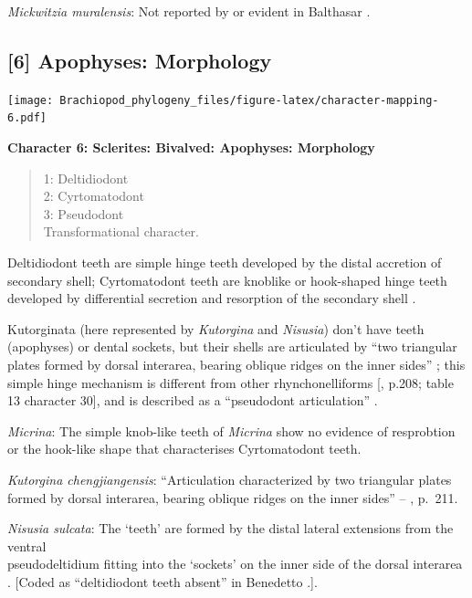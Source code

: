 \documentclass[]{book}
\theoremstyle{definition}
\theoremstyle{definition}
\theoremstyle{definition}
\theoremstyle{remark}
\begin{document}
\emph{Mickwitzia muralensis}: Not reported by or evident in Balthasar
\citeyearpar{Balthasar2004Shellstructure}.

\hypertarget{apophyses-morphology}{%
\subsection*{{[}6{]} Apophyses: Morphology}\label{apophyses-morphology}}

\texttt{[image: Brachiopod\_phylogeny\_files/figure-latex/character-mapping-6.pdf]}

\textbf{Character 6: Sclerites: Bivalved: Apophyses: Morphology}

\begin{quote}
1: Deltidiodont\\
2: Cyrtomatodont\\
3: Pseudodont\\
Transformational character.
\end{quote}

Deltidiodont teeth are simple hinge teeth developed by the distal
accretion of secondary shell; Cyrtomatodont teeth are knoblike or
hook-shaped hinge teeth developed by differential secretion and
resorption of the secondary shell \citep[fig. 322
in][]{Williams2000BrachiopodaLinguliformea}.

Kutorginata (here represented by \emph{Kutorgina} and \emph{Nisusia})
don't have teeth (apophyses) or dental sockets, but their shells are
articulated by ``two triangular plates formed by dorsal interarea,
bearing oblique ridges on the inner sides''
\citep[p.~211]{Williams2000BrachiopodaLinguliformea}; this simple hinge
mechanism is different from other rhynchonelliforms
{[}\citet{Williams2000BrachiopodaLinguliformea}, p.208; table 13
character 30{]}, and is described as a ``pseudodont articulation''
\citep{Holmer2018Evolutionarysignificance}.

\emph{Micrina}: The simple knob-like teeth of \emph{Micrina} show no
evidence of resprobtion or the hook-like shape that characterises
Cyrtomatodont teeth.

\emph{Kutorgina chengjiangensis}: ``Articulation characterized by two
triangular plates formed by dorsal interarea, bearing oblique ridges on
the inner sides'' -- \citet{Williams2000BrachiopodaLinguliformea},
p.~211.

\emph{Nisusia sulcata}: The `teeth' are formed by the distal lateral
extensions from the ventral\\
pseudodeltidium fitting into the `sockets' on the inner side of the
dorsal interarea \citep{Holmer2018Evolutionarysignificance}. {[}Coded as
``deltidiodont teeth absent'' in Benedetto
\citeyearpar{Benedetto2009iChaniella}.{]}.
\end{document}
